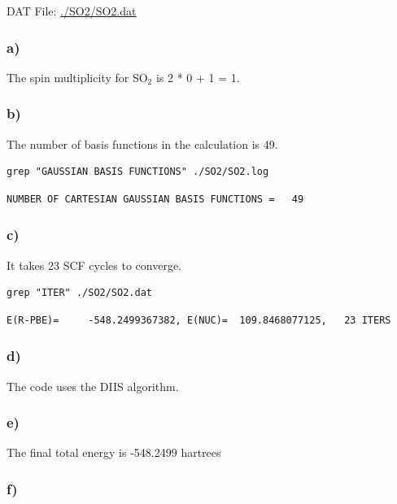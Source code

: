 \documentclass[11pt]{article}
\begin{document}
DAT File: \url{./SO2/SO2.dat}

\subsubsection{a)}
\label{sec-2-1-1}

The spin multiplicity for SO$_{\text{2}}$ is 2 * 0 + 1 = 1. 

\subsubsection{b)}
\label{sec-2-1-2}
The number of basis functions in the calculation is 49.

\begin{verbatim}
grep "GAUSSIAN BASIS FUNCTIONS" ./SO2/SO2.log
\end{verbatim}

\begin{verbatim}
NUMBER OF CARTESIAN GAUSSIAN BASIS FUNCTIONS =   49
\end{verbatim}


\subsubsection{c)}
\label{sec-2-1-3}

It takes 23 SCF cycles to converge.

\begin{verbatim}
grep "ITER" ./SO2/SO2.dat
\end{verbatim}

\begin{verbatim}
E(R-PBE)=     -548.2499367382, E(NUC)=  109.8468077125,   23 ITERS
\end{verbatim}

\subsubsection{d)}
\label{sec-2-1-4}

The code uses the DIIS algorithm.


\subsubsection{e)}
\label{sec-2-1-5}

The final total energy is -548.2499 hartrees

\subsubsection{f)}
\label{sec-2-1-6}
\end{document}
